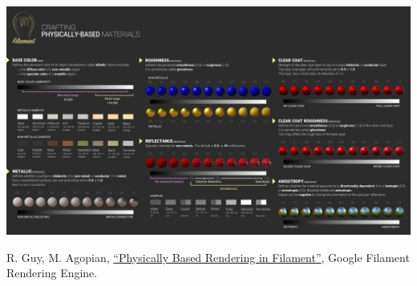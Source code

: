 \documentclass[utf8,stillsansserifmath,fleqn,t]{beamer}
\newcommand{\literature}[1]{{\tiny #1 \par}}
\begin{document}
\begin{frame}
\frametitle{\insertsection}
~\\
\centerline{\includegraphics[width=\textwidth]{./fig/filament-overview.jpg}}
\literature{R. Guy, M. Agopian, \href{https://google.github.io/filament/Filament.md.html}{``Physically Based Rendering in Filament''}, Google Filament Rendering Engine.}
\end{frame}
\end{document}
